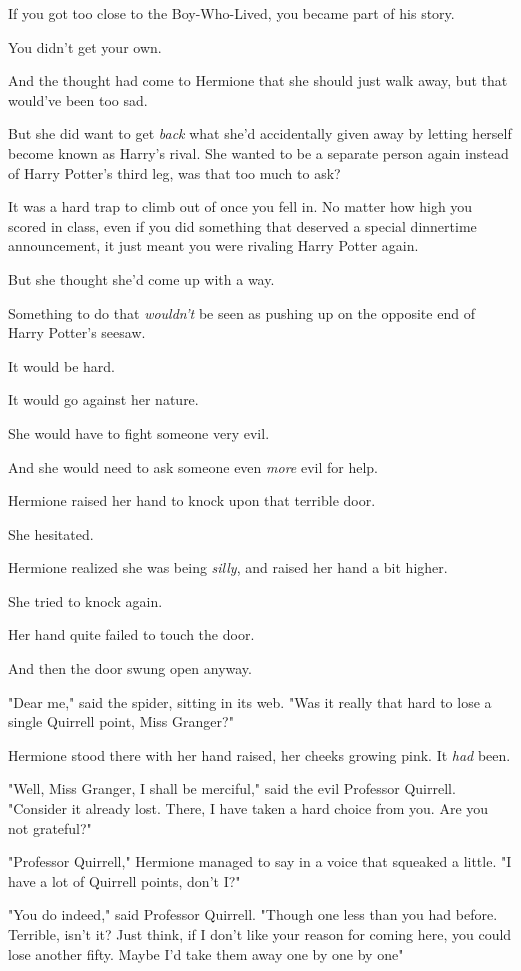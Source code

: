 If you got too close to the Boy-Who-Lived, you became part of his story.

You didn't get your own.

And the thought had come to Hermione that she should just walk away, but that
would've been too sad.

But she did want to get \emph{back} what she'd accidentally given away by
letting herself become known as Harry's rival. She wanted to be a separate
person again instead of Harry Potter's third leg, was that too much to ask?

It was a hard trap to climb out of once you fell in. No matter how high you
scored in class, even if you did something that deserved a special dinnertime
announcement, it just meant you were rivaling Harry Potter again.

But she thought she'd come up with a way.

Something to do that \emph{wouldn't} be seen as pushing up on the opposite end
of Harry Potter's seesaw.

It would be hard.

It would go against her nature.

She would have to fight someone very evil.

And she would need to ask someone even \emph{more} evil for help.

Hermione raised her hand to knock upon that terrible door.

She hesitated.

Hermione realized she was being \emph{silly}, and raised her hand a bit higher.

She tried to knock again.

Her hand quite failed to touch the door.

And then the door swung open anyway.

"Dear me," said the spider, sitting in its web. "Was it really that hard to
lose a single Quirrell point, Miss Granger?"

Hermione stood there with her hand raised, her cheeks growing pink. It
\emph{had} been.

"Well, Miss Granger, I shall be merciful," said the evil Professor Quirrell.
"Consider it already lost. There, I have taken a hard choice from you. Are you
not grateful?"

"Professor Quirrell," Hermione managed to say in a voice that squeaked a
little. "I have a lot of Quirrell points, don't I?"

"You do indeed," said Professor Quirrell. "Though one less than you had before.
Terrible, isn't it? Just think, if I don't like your reason for coming here,
you could lose another fifty. Maybe I'd take them away one{\el} by
one{\el} by one{\el}"


